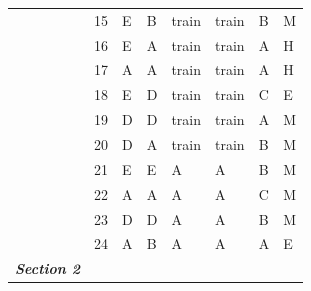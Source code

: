\documentclass[pageno]{final_paper}
\newcommand{\textbi}[1]{\textbf{\textit{#1}}}
\begin{document}
\begin{table}[]
\begin{tabular}{llllllll}
\textbf{}                & 15              & E                       & B                      & train                   & train                   & B                       & M                   \\
\textbf{}                & 16              & E                       & A                      & train                   & train                   & A                       & H                   \\
\textbf{}                & 17              & A                       & A                      & train                   & train                   & A                       & H                   \\
\textbf{}                & 18              & E                       & D                      & train                   & train                   & C                       & E                   \\
\textbf{}                & 19              & D                       & D                      & train                   & train                   & A                       & M                   \\
\textbf{}                & 20              & D                       & A                      & train                   & train                   & B                       & M                   \\
\textbf{}                & 21              & E                       & E                      & A                       & A                       & B                       & M                   \\
\textbf{}                & 22              & A                       & A                      & A                       & A                       & C                       & M                   \\
\textbf{}                & 23              & D                       & D                      & A                       & A                       & B                       & M                   \\
\textbf{}                & 24              & A                       & B                      & A                       & A                       & A                       & E                   \\ \midrule
\textbi{Section 2}       &                 &                         &                        &                         &                         &                         &                     \\ \midrule

\end{tabular}
\end{table}
\end{document}
